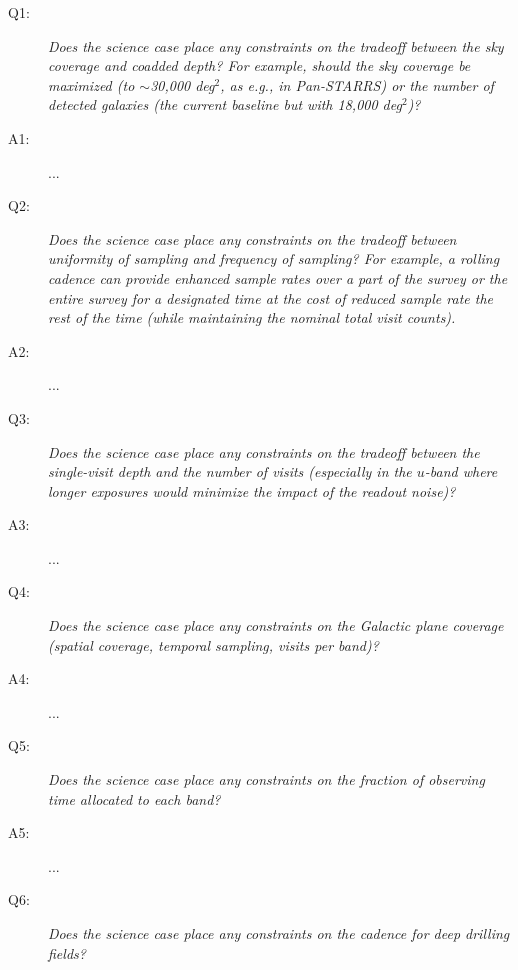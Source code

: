 %
%
%
\begin{description}

\item[Q1:] {\it Does the science case place any constraints on the
tradeoff between the sky coverage and coadded depth? For example, should
the sky coverage be maximized (to $\sim$30,000 deg$^2$, as e.g., in
Pan-STARRS) or the number of detected galaxies (the current baseline but
with 18,000 deg$^2$)?}

\item[A1:] ...

\item[Q2:] {\it Does the science case place any constraints on the
tradeoff between uniformity of sampling and frequency of  sampling? For
example, a rolling cadence can provide enhanced sample rates over a part
of the survey or the entire survey for a designated time at the cost of
reduced sample rate the rest of the time (while maintaining the nominal
total visit counts).}

\item[A2:] ...

\item[Q3:] {\it Does the science case place any constraints on the
tradeoff between the single-visit depth and the number of visits
(especially in the $u$-band where longer exposures would minimize the
impact of the readout noise)?}

\item[A3:] ...

\item[Q4:] {\it Does the science case place any constraints on the
Galactic plane coverage (spatial coverage, temporal sampling, visits per
band)?}

\item[A4:] ...

\item[Q5:] {\it Does the science case place any constraints on the
fraction of observing time allocated to each band?}

\item[A5:] ...

\item[Q6:] {\it Does the science case place any constraints on the
cadence for deep drilling fields?}


\end{description}
